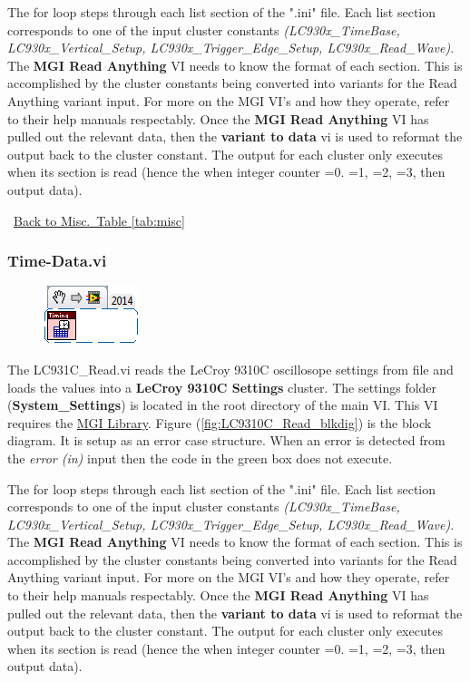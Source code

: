 \documentclass[11pt,a4paper,oldfontcommands]{memoir}
\begin{document}
The for loop steps through each list section of the ".ini" file. Each list section corresponds to one of the input cluster constants \textit{(LC930x\_TimeBase, LC930x\_Vertical\_Setup, LC930x\_Trigger\_Edge\_Setup, LC930x\_Read\_Wave)}. The \textbf{MGI Read Anything} VI needs to know the format of each section. This is accomplished by the cluster constants being converted into variants for the Read Anything variant input.  For more on the MGI VI's and how they operate, refer to their help manuals respectably. Once the \textbf{MGI Read Anything} VI has pulled out the relevant data, then the \textbf{variant to data} vi is used to reformat the output back to the cluster constant. The output for each cluster only executes when its section is read (hence the when integer counter =0. =1, =2, =3, then output data).

\noindent\hrulefill\, \hyperref[tab:misc]{Back to Misc.\ Table \ref{tab:misc}}

\subsubsection{Time-Data.vi} \label{Time-Data}
\noindent\hrulefill

\begin{figure}[h]
	\includegraphics[scale=0.625]{Time-Data_main_01}
	\label{fig:Time-Data_main_01}
\end{figure}

The LC931C\_Read.vi reads the LeCroy 9310C oscillosope settings from file and loads the values into a \textbf{LeCroy 9310C Settings} cluster. The settings folder (\textbf{System\_Settings}) is located in the root directory of the main VI. This VI requires the \href{http://sine.ni.com/nips/cds/view/p/lang/en/nid/209753}{MGI Library}. Figure (\ref{fig:LC9310C_Read_blkdig}) is the block diagram.  It is setup as an error case structure. When an error is detected from the \textit{error (in)} input then the code in the green box does not execute.

The for loop steps through each list section of the ".ini" file. Each list section corresponds to one of the input cluster constants \textit{(LC930x\_TimeBase, LC930x\_Vertical\_Setup, LC930x\_Trigger\_Edge\_Setup, LC930x\_Read\_Wave)}. The \textbf{MGI Read Anything} VI needs to know the format of each section. This is accomplished by the cluster constants being converted into variants for the Read Anything variant input.  For more on the MGI VI's and how they operate, refer to their help manuals respectably. Once the \textbf{MGI Read Anything} VI has pulled out the relevant data, then the \textbf{variant to data} vi is used to reformat the output back to the cluster constant. The output for each cluster only executes when its section is read (hence the when integer counter =0. =1, =2, =3, then output data).
\end{document}
